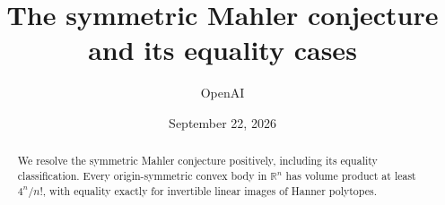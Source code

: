 \documentclass[11pt]{article}
\title{The symmetric Mahler conjecture and its equality cases}
\author{OpenAI}
\date{September 22, 2026}
\theoremstyle{definition}
\newcommand{\R}{\mathbb R}
\begin{document}
\maketitle
\begin{abstract}
We resolve the symmetric Mahler conjecture positively, including its
equality classification. Every origin-symmetric convex body in $\R^n$ has volume
product at least $4^n/n!$, with equality exactly for invertible linear
images of Hanner polytopes.
\end{abstract}
\tableofcontents










\end{document}
